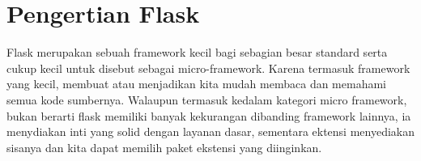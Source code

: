 
\section{Pengertian Flask}
Flask merupakan sebuah framework kecil bagi sebagian besar standard serta cukup kecil untuk disebut sebagai micro-framework. 
Karena termasuk framework yang kecil, membuat atau menjadikan kita mudah membaca dan memahami semua kode sumbernya. 
Walaupun termasuk kedalam kategori micro framework, bukan berarti flask memiliki banyak kekurangan dibanding framework lainnya, ia menydiakan inti yang solid dengan layanan dasar, sementara ektensi menyediakan sisanya dan kita dapat memilih paket ekstensi yang diinginkan.
